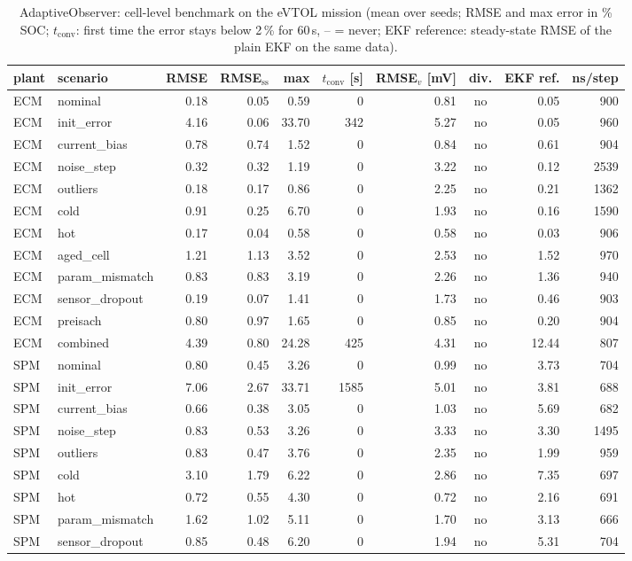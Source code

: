 \begin{table}[H]\centering\footnotesize\setlength{\tabcolsep}{4pt}
\caption{AdaptiveObserver: cell-level benchmark on the eVTOL mission (mean over seeds; RMSE and max error in \% SOC; $t_\mathrm{conv}$: first time the error stays below 2\,\% for 60\,s, -- = never; EKF reference: steady-state RMSE of the plain EKF on the same data).}\label{tab:cell_AdaptiveObserver}
\begin{tabular}{llrrrrrcrr}\toprule
plant & scenario & RMSE & RMSE$_\mathrm{ss}$ & max & $t_\mathrm{conv}$ [s] & RMSE$_v$ [mV] & div. & EKF ref. & ns/step \\ \midrule
ECM & nominal & 0.18 & 0.05 & 0.59 & 0 & 0.81 & no & 0.05 & 900 \\
ECM & init\_error & 4.16 & 0.06 & 33.70 & 342 & 5.27 & no & 0.05 & 960 \\
ECM & current\_bias & 0.78 & 0.74 & 1.52 & 0 & 0.84 & no & 0.61 & 904 \\
ECM & noise\_step & 0.32 & 0.32 & 1.19 & 0 & 3.22 & no & 0.12 & 2539 \\
ECM & outliers & 0.18 & 0.17 & 0.86 & 0 & 2.25 & no & 0.21 & 1362 \\
ECM & cold & 0.91 & 0.25 & 6.70 & 0 & 1.93 & no & 0.16 & 1590 \\
ECM & hot & 0.17 & 0.04 & 0.58 & 0 & 0.58 & no & 0.03 & 906 \\
ECM & aged\_cell & 1.21 & 1.13 & 3.52 & 0 & 2.53 & no & 1.52 & 970 \\
ECM & param\_mismatch & 0.83 & 0.83 & 3.19 & 0 & 2.26 & no & 1.36 & 940 \\
ECM & sensor\_dropout & 0.19 & 0.07 & 1.41 & 0 & 1.73 & no & 0.46 & 903 \\
ECM & preisach & 0.80 & 0.97 & 1.65 & 0 & 0.85 & no & 0.20 & 904 \\
ECM & combined & 4.39 & 0.80 & 24.28 & 425 & 4.31 & no & 12.44 & 807 \\
\midrule
SPM & nominal & 0.80 & 0.45 & 3.26 & 0 & 0.99 & no & 3.73 & 704 \\
SPM & init\_error & 7.06 & 2.67 & 33.71 & 1585 & 5.01 & no & 3.81 & 688 \\
SPM & current\_bias & 0.66 & 0.38 & 3.05 & 0 & 1.03 & no & 5.69 & 682 \\
SPM & noise\_step & 0.83 & 0.53 & 3.26 & 0 & 3.33 & no & 3.30 & 1495 \\
SPM & outliers & 0.83 & 0.47 & 3.76 & 0 & 2.35 & no & 1.99 & 959 \\
SPM & cold & 3.10 & 1.79 & 6.22 & 0 & 2.86 & no & 7.35 & 697 \\
SPM & hot & 0.72 & 0.55 & 4.30 & 0 & 0.72 & no & 2.16 & 691 \\
SPM & param\_mismatch & 1.62 & 1.02 & 5.11 & 0 & 1.70 & no & 3.13 & 666 \\
SPM & sensor\_dropout & 0.85 & 0.48 & 6.20 & 0 & 1.94 & no & 5.31 & 704 \\
\bottomrule\end{tabular}\end{table}
